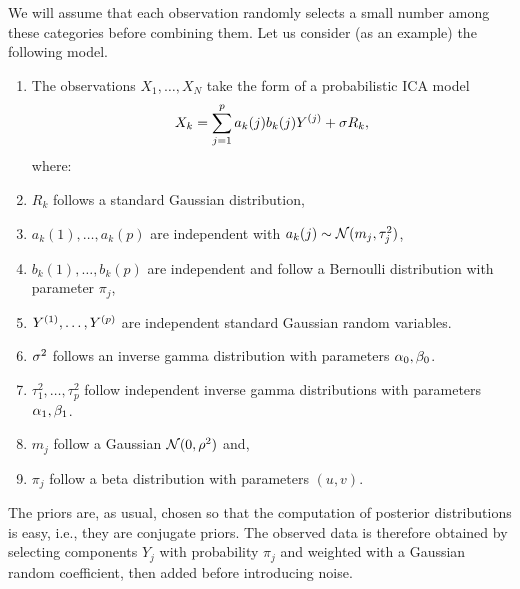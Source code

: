 We will assume that each observation randomly selects a small number among these categories before combining them.  Let us consider (as an example) the following model. 
\begin{enumerate}[label=\textbullet, wide=0.5cm]
\item The observations $X_1, \ldots, X_N$ take the form of a probabilistic ICA model
\[
X_k = \sum_{j=1}^p {a_k}(j) b_k(j) Y^{(j)}  + \sigma R_k, 
\]
where:
\item $R_k$ follows a standard Gaussian distribution,
\item $a_k(1), \ldots, a_k(p)$ are independent with $a_k(j) \sim {\mathcal N}(m_j, \tau_j^2)$,
\item $b_k(1), \ldots, b_k(p)$ are independent and follow a Bernoulli distribution with parameter $\pi_j$,
\item $Y^{(1)}, \ldots, Y^{(p)}$ are independent standard Gaussian random variables.
\item $\sigma^2$ follows an inverse gamma distribution with parameters $\alpha_0, \beta_0$.
\item $\tau_1^2, \ldots, \tau_p^2$ follow independent inverse gamma distributions with parameters $\alpha_1, \beta_1$.
\item $m_j$ follow a Gaussian ${\mathcal N}(0, \rho^2)$ and,
\item $\pi_j$ follow a beta distribution with parameters $(u,v)$.
\end{enumerate}
 The priors are, as usual, chosen so that the computation of posterior distributions is easy, i.e., they are conjugate priors. The observed data is therefore obtained by  selecting  components $Y_j$ with probability $\pi_j$ and weighted with a Gaussian random coefficient, then added before introducing noise.
 


